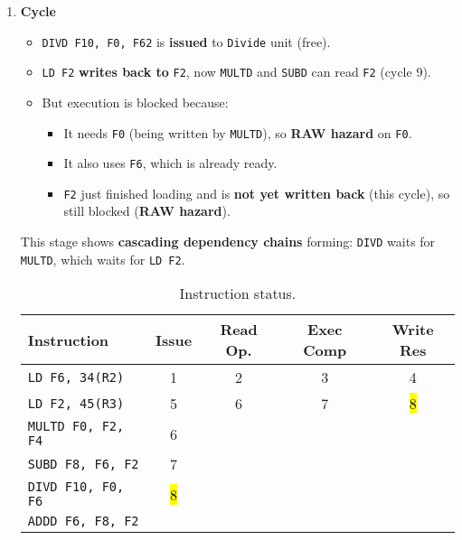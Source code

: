 \begin{enumerate}
    \newpage

    
    \item \textbf{Cycle \theenumi}
    \begin{itemize}
        \item[\textcolor{Green3}{\faIcon{check}}] \texttt{DIVD F10, F0, F62} is \textbf{issued} to \texttt{Divide} unit (free).
        \item[\textcolor{Green3}{\faIcon{check}}] \texttt{LD F2} \textbf{writes back to} \texttt{F2}, now \texttt{MULTD} and \texttt{SUBD} can read \texttt{F2} (cycle 9).
        \item[\textcolor{Red2}{\faIcon{times}}] But execution is blocked because:
        \begin{itemize}
            \item It needs \texttt{F0} (being written by \texttt{MULTD}), so \textbf{RAW hazard} on \texttt{F0}.
            \item It also uses \texttt{F6}, which is already ready.
            \item \texttt{F2} just finished loading and is \textbf{not yet written back} (this cycle), so still blocked (\textbf{RAW hazard}).
        \end{itemize}
    \end{itemize}
    This stage shows \textbf{cascading dependency chains} forming: \texttt{DIVD} waits for \texttt{MULTD}, which waits for \texttt{LD F2}.

    \begin{table}[!htp]
        \centering
        \begin{tabular}{@{} l | c c c c @{}}
            \toprule
            Instruction                 & Issue & Read Op.  & Exec Comp & Write Res \\
            \midrule
            \texttt{LD    F6, 34(R2)}   & 1     & 2         & 3         & 4         \\ [.3em]
            \texttt{LD    F2, 45(R3)}   & 5     & 6         & 7         & \hl{8}    \\ [.3em]
            \texttt{MULTD F0, F2, F4}   & 6     &           &           &           \\ [.3em]
            \texttt{SUBD  F8, F6, F2}   & 7     &           &           &           \\ [.3em]
            \texttt{DIVD  F10, F0, F6}  & \hl{8}&           &           &           \\ [.3em]
            \texttt{ADDD  F6, F8, F2}   &       &           &           &           \\
            \bottomrule
        \end{tabular}
        \caption*{Instruction status.}
    \end{table}


\end{enumerate}
